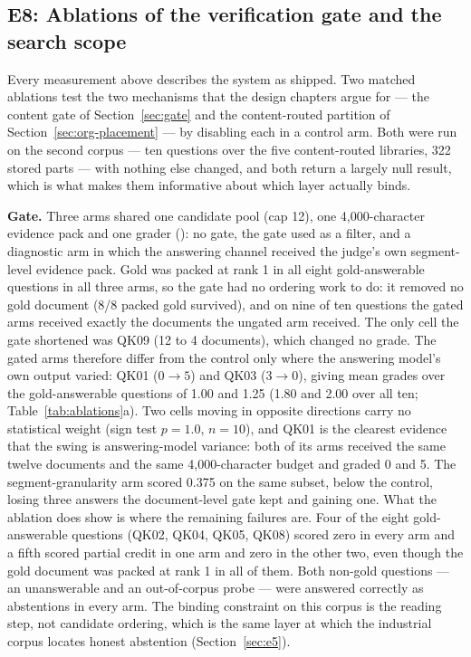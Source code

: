 \subsection{E8: Ablations of the verification gate and the search scope}
\label{sec:e8}
Every measurement above describes the system as shipped. Two matched
ablations test the two mechanisms that the design chapters argue for --- the
content gate of Section~\ref{sec:gate} and the content-routed partition of
Section~\ref{sec:org-placement} --- by disabling each in a control arm. Both
were run on the second
corpus --- ten questions over the five content-routed libraries, 322
stored parts --- with nothing else changed, and both return a largely null
result, which is what makes them informative about which layer actually
binds.

\textbf{Gate.}
Three arms shared one candidate pool (cap 12), one 4{,}000-character
evidence pack and one grader
(): no gate,
the gate used as a filter, and a
diagnostic arm in which the answering channel received the judge's own
segment-level evidence pack. Gold was packed at rank 1 in all eight
gold-answerable questions in all three arms, so the gate had no ordering
work to do: it removed no gold document (8/8 packed gold survived), and on
nine of ten questions the gated arms received exactly the documents the
ungated arm received. The only cell the gate shortened was QK09 (12 to 4
documents), which changed no grade. The gated arms therefore differ from the
control only where the answering model's own output varied: QK01
($0\to5$) and QK03 ($3\to0$), giving mean grades over the
gold-answerable questions of 1.00 and 1.25 (1.80 and 2.00 over all ten;
Table~\ref{tab:ablations}a). Two cells moving in opposite directions carry
no statistical weight (sign test $p = 1.0$, $n = 10$), and QK01 is the
clearest evidence that the swing is answering-model variance: both of its
arms received the same twelve documents and the same 4{,}000-character
budget and graded 0 and 5. The segment-granularity arm scored 0.375 on the
same subset, below the control, losing three answers the document-level gate
kept and gaining one. What the ablation
does show is where the remaining failures are. Four of the eight
gold-answerable questions (QK02, QK04, QK05, QK08) scored zero in every
arm and a fifth scored partial credit in one arm and zero in the other
two, even though the gold document was packed at rank 1 in all of them.
Both non-gold questions --- an unanswerable and an out-of-corpus
probe --- were answered correctly as abstentions in every arm. The binding
constraint on this corpus is the reading step, not candidate ordering,
which is the same layer at which the industrial corpus locates honest
abstention (Section~\ref{sec:e5}).


